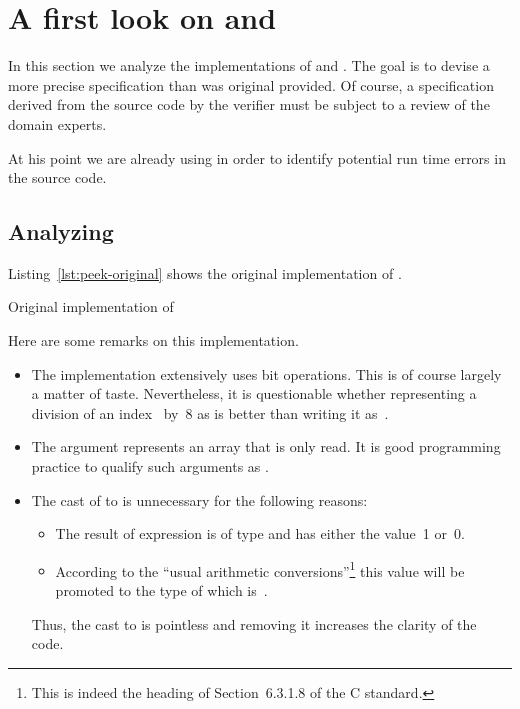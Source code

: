 \clearpage

\section{A first look on \peek and \poke}
\label{sec:bitwalker-first-look}

In this section we analyze the implementations of \peek 
and \poke.
The goal is to devise a more precise specification than
was original provided.
Of course, a specification derived from the source code by the verifier
must be subject to a review of the domain experts.

At his point we are already using \framacwp in order to identify
potential run time errors in the source code.

\subsection{Analyzing \peek}
\label{sec:bitwalker-peek-first-look}

Listing~\ref{lst:peek-original} shows the original implementation of \peek.


\begin{listing}[hbt]
\begin{minipage}{\textwidth}

\end{minipage}
\caption{\label{lst:peek-original} Original implementation of \peek}
\end{listing}

Here are some remarks on this implementation.

\begin{itemize}
\item The implementation extensively uses bit operations.
      This is of course largely a matter of taste.
      Nevertheless, it is questionable whether representing a division 
      of an index~ by~8 as  is better than writing it as~.
\item The argument  represents an array that is only read.
      It is good programming practice to qualify such arguments as .

\item The cast of  to  is unnecessary for the following reasons:
\begin{itemize}
\item The result of expression  is of type  and has either the value~1 or~0.
\item According to the ``usual arithmetic conversions''\footnote{%
     This is indeed the heading of Section~6.3.1.8 of the C standard.
}
this value will be promoted to the type of  which is~.
\end{itemize}

    Thus, the cast to  is pointless and removing it increases the clarity of the code.

\end{itemize}

